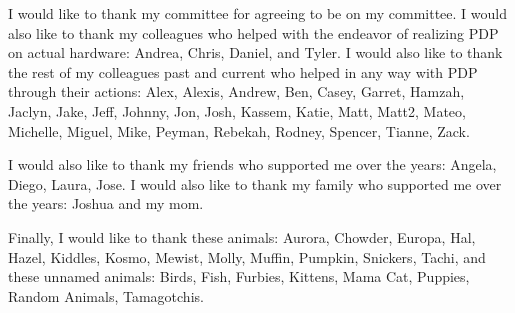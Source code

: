 I would like to thank my committee for agreeing to be on my committee. I would also like to thank my colleagues who helped with the endeavor of realizing PDP on actual hardware: Andrea, Chris, Daniel, and Tyler. I would also like to thank the rest of my colleagues past and current who helped in any way with PDP through their actions: Alex, Alexis, Andrew, Ben, Casey, Garret, Hamzah, Jaclyn, Jake, Jeff, Johnny, Jon, Josh, Kassem, Katie, Matt, Matt2, Mateo, Michelle, Miguel, Mike, Peyman, Rebekah, Rodney, Spencer, Tianne, Zack.

I would also like to thank my friends who supported me over the years: Angela, Diego, Laura, Jose. I would also like to thank my family who supported me over the years: Joshua and my mom.

Finally, I would like to thank these animals: Aurora, Chowder, Europa, Hal, Hazel, Kiddles, Kosmo, Mewist, Molly, Muffin, Pumpkin, Snickers, Tachi, and these unnamed animals: Birds, Fish, Furbies, Kittens, Mama Cat, Puppies, Random Animals, Tamagotchis.
